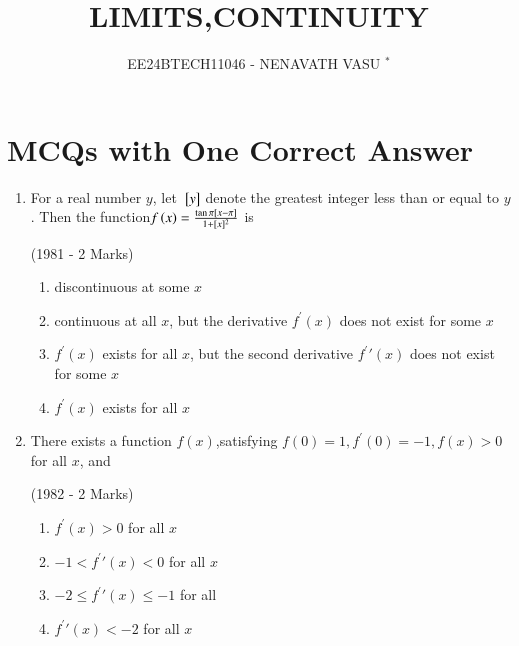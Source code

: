 \documentclass[journal,12pt,onecolumn]{IEEEtran}
\theoremstyle{remark}
\begin{document}

\vspace{3cm}

\title{LIMITS,CONTINUITY}
\author{EE24BTECH11046 - NENAVATH VASU $^{*}$%
}
\maketitle
\bigskip

\renewcommand{\thefigure}{\theenumi}
\renewcommand{\thetable}{\theenumi}


\section{ MCQs with One Correct Answer}



\begin{enumerate}
   
\item For a real number $y$, let ${}\left[y\right]$ denote the greatest integer less than or equal to $y$. Then the function{$f\left(x\right)=\frac{\tan\pi{}\left[x-\pi\right]}{1+[x]^2}$} is

\hfill                    (1981 - 2 Marks)
   \begin{enumerate}
       \item discontinuous at some $x$
        \item continuous at all $x$, but the derivative $f^{\prime}(x)$ does not exist for some $x$
        \item $f^{\prime}(x)$ exists for all $x$, but the second derivative $f^{\prime}{\prime}(x)$ does not exist for some $x$
        \item $f^{\prime}(x)$ exists for all $x$
   \end{enumerate}




\item There exists a function $f(x)$,satisfying $f(0)=1, f^{\prime}(0)=-1, f(x)>0$ for all $x$, and 

\hfill      (1982 - 2 Marks)
    \begin{enumerate}

          \item $f^{\prime}(x) > 0$ for all $x$
          \item$ -1 < f^{\prime}{\prime}(x) < 0$ for all $x$
          \item $-2 \leq f^{\prime}{\prime}(x) \leq -1$ for  all 
          \item $f^{\prime}{\prime}(x) < -2$ for all $x$


\end{enumerate}
\end{enumerate}
\end{document}
